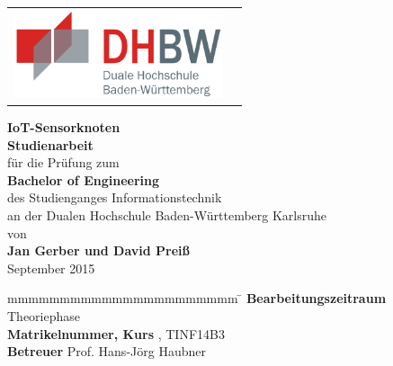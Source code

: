 \begin{titlepage}
	\begin{longtable}{p{} p{}}
		{\includegraphics[height=2.6cm]{bilder/dhbw}}
	\end{longtable}
	\enlargethispage{20mm}
	\begin{center}
		\vspace*{12mm}	{\LARGE \textbf{ IoT-Sensorknoten} }\\
		\vspace*{12mm}	{\large \textbf{ Studienarbeit}}\\
		\vspace*{12mm}	für die Prüfung zum\\
		\vspace*{3mm}		{\textbf{ Bachelor of Engineering}}\\
    \vspace*{12mm}	des Studienganges Informationstechnik{} \\
    \vspace*{3mm}		an der Dualen Hochschule Baden-Württemberg Karlsruhe{} \\
		\vspace*{12mm}	von\\
		\vspace*{3mm}		{\large \textbf{ Jan Gerber und David Preiß}}\\
		\vspace*{12mm}	September 2015\\
	\end{center}
	\vfill
	\begin{spacing}{1.2}
	\begin{tabbing}
		mmmmmmmmmmmmmmmmmmmmmm            \= \kill
		\textbf{Bearbeitungszeitraum}       \>  Theoriephase\\
		\textbf{Matrikelnummer, Kurs}  , TINF14B3\\
		\textbf{Betreuer}               \>  Prof. Hans-Jörg Haubner
	\end{tabbing}
	\end{spacing}
\end{titlepage}
